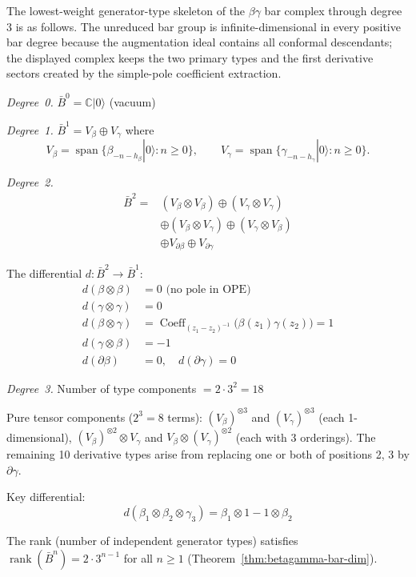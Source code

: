\begin{theorem}
\label{thm:betagamma-complete-bar}
The lowest-weight generator-type skeleton of the $\beta\gamma$ bar
complex through degree~$3$ is as follows. The unreduced bar group is
infinite-dimensional in every positive bar degree because the
augmentation ideal contains all conformal descendants; the displayed
complex keeps the two primary types and the first derivative sectors
created by the simple-pole coefficient extraction.

\emph{Degree~0.} $\bar{B}^0 = \mathbb{C}|0\rangle$ (vacuum)

\emph{Degree~1.} $\bar{B}^1 = V_\beta \oplus V_\gamma$ where
\[
V_\beta = \operatorname{span}\{\beta_{-n-h_\beta}|0\rangle : n \geq 0\},
\qquad
V_\gamma = \operatorname{span}\{\gamma_{-n-h_\gamma}|0\rangle : n \geq 0\}.
\]

\emph{Degree~2.}
\begin{align}
\bar{B}^2 = &(V_\beta \otimes V_\beta) \oplus (V_\gamma \otimes V_\gamma) \\
&\oplus (V_\beta \otimes V_\gamma) \oplus (V_\gamma \otimes V_\beta) \\
&\oplus V_{\partial\beta} \oplus V_{\partial\gamma}
\end{align}

The differential $d: \bar{B}^2 \to \bar{B}^1$:
\begin{align}
d(\beta \otimes \beta) &= 0 \text{ (no pole in OPE)} \\
d(\gamma \otimes \gamma) &= 0 \\
d(\beta \otimes \gamma)
&= \operatorname{Coeff}_{(z_1-z_2)^{-1}}
\bigl(\beta(z_1)\gamma(z_2)\bigr) = 1 \\
d(\gamma \otimes \beta) &= -1 \\
d(\partial\beta) &= 0, \quad d(\partial\gamma) = 0
\end{align}

\emph{Degree~3.} Number of type components $= 2 \cdot 3^2 = 18$

Pure tensor components ($2^3 = 8$ terms): $(V_\beta)^{\otimes 3}$ and $(V_\gamma)^{\otimes 3}$ (each 1-dimensional), $(V_\beta)^{\otimes 2} \otimes V_\gamma$ and $V_\beta \otimes (V_\gamma)^{\otimes 2}$ (each with 3 orderings). The remaining 10 derivative types arise from replacing one or both of positions 2, 3 by $\partial\gamma$.

Key differential:
\[d(\beta_1 \otimes \beta_2 \otimes \gamma_3) = \beta_1 \otimes 1 - 1 \otimes \beta_2\]

The rank (number of independent generator types) satisfies $\operatorname{rank}(\bar{B}^n) = 2 \cdot 3^{n-1}$ for all $n \geq 1$ (Theorem~\ref{thm:betagamma-bar-dim}).
\end{theorem}

